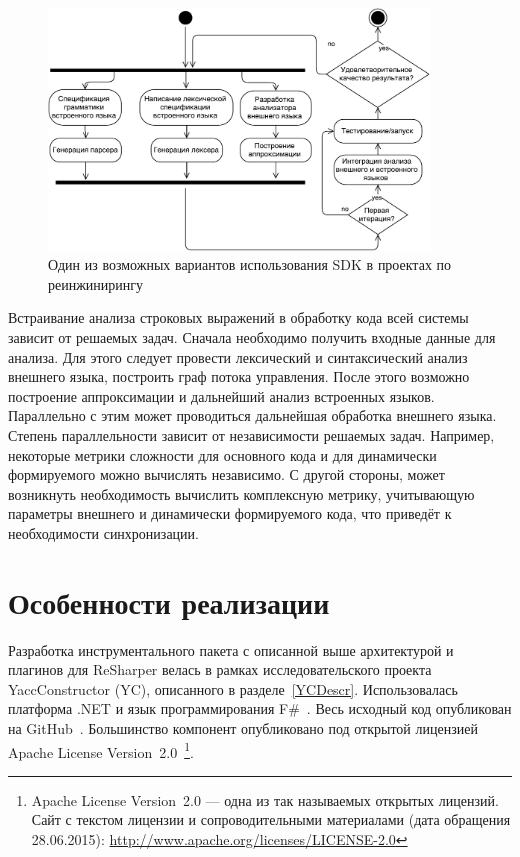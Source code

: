 \begin{figure}[h!]
\begin{center}
\includegraphics[width=0.9\textwidth]{pics/ActivMethodology}
\caption{Один из возможных вариантов использования SDK в проектах по реинжинирингу}
\label{fig:activMethod} 
\end{center}
\end{figure}

Встраивание анализа строковых выражений в обработку кода всей системы зависит от решаемых задач. Сначала необходимо получить входные данные для анализа. Для этого следует провести лексический и синтаксический анализ внешнего языка, построить граф потока управления. После этого возможно построение аппроксимации и дальнейший анализ встроенных языков. Параллельно с этим может проводиться дальнейшая обработка внешнего языка. Степень параллельности зависит от независимости решаемых задач. Например, некоторые метрики сложности для основного кода и для динамически формируемого можно вычислять независимо. С другой стороны, может возникнуть необходимость вычислить комплексную метрику, учитывающую параметры внешнего и динамически формируемого кода, что приведёт к необходимости синхронизации.

\section{Особенности реализации}

Разработка инструментального пакета с описанной выше архитектурой и плагинов для ReSharper велась в рамках исследовательского проекта YaccConstructor (YC), описанного в разделе~\ref{YCDescr}. 
Использовалась платформа .NET и язык программирования F\#~\cite{FSharp}. Весь исходный код опубликован на GitHub~\cite{YCUrl}. 
Большинство компонент опубликовано под открытой лицензией Apache License Version~2.0~\footnote{Apache License Version~2.0 --- одна из так называемых открытых лицензий. Сайт с текстом лицензии и сопроводительными материалами (дата обращения 28.06.2015): \url{http://www.apache.org/licenses/LICENSE-2.0}}. 

